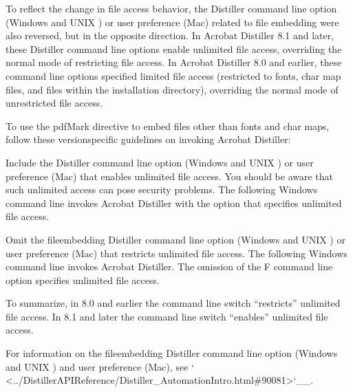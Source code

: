 \documentclass[letterpaper,12pt,english,openany,oneside]{sphinxmanual}
\begin{document}
To reflect the change in file access behavior, the Distiller command line option (Windows and UNIX ) or user preference (Mac) related to file embedding were also reversed, but in the opposite direction. In Acrobat Distiller 8.1 and later, these Distiller command line options enable unlimited file access, overriding the normal mode of restricting file access. In Acrobat Distiller 8.0 and earlier, these command line options specified limited file access (restricted to fonts, char map files, and files within the installation directory), overriding the normal mode of unrestricted file access.

To use the  pdfMark directive to embed files other than fonts and char maps, follow these version\sphinxhyphen{}specific guidelines on invoking Acrobat Distiller:

 Include the Distiller command line option (Windows and UNIX ) or user preference (Mac) that enables unlimited file access. You should be aware that such unlimited access can pose security problems. The following Windows command line invokes Acrobat Distiller with the option that specifies unlimited file access.

\begin{sphinxVerbatim}[commandchars=\\\{\}]
  
\end{sphinxVerbatim}

 Omit the file\sphinxhyphen{}embedding Distiller command line option (Windows and UNIX ) or user preference (Mac) that restricts unlimited file access. The following Windows command line invokes Acrobat Distiller. The omission of the \sphinxhyphen{}F command line option specifies unlimited file access.

\begin{sphinxVerbatim}[commandchars=\\\{\}]
 
\end{sphinxVerbatim}

To summarize, in 8.0 and earlier the command line switch “restricts” unlimited file access. In 8.1 and later the command line switch “enables” unlimited file access.

For information on the file\sphinxhyphen{}embedding Distiller command line option (Windows and UNIX ) and user preference (Mac), see ` <../DistillerAPIReference/Distiller\_AutomationIntro.html\#90081>`\_\_.
\end{document}
